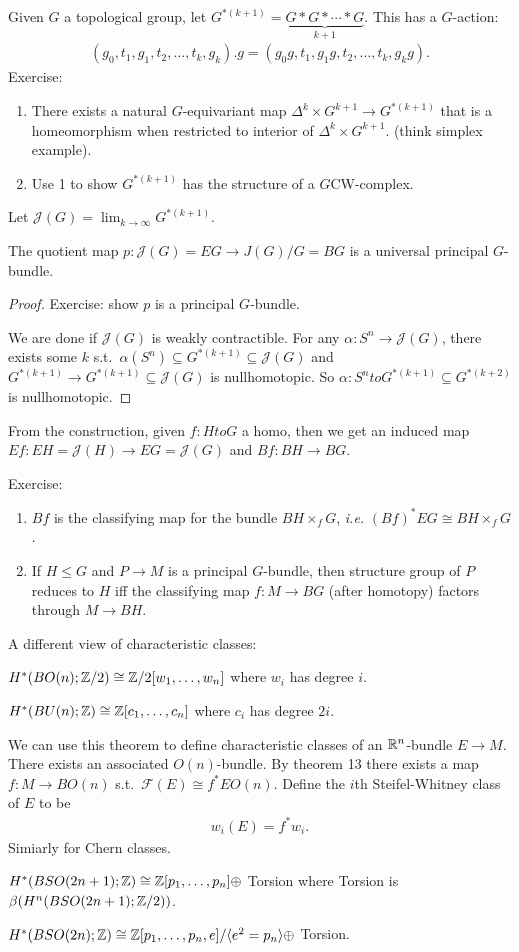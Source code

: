 \documentclass[12pt,class=article,crop=false]{standalone}
\begin{document}
Given $ G$ a topological group, let  $ G^{*(k+1)} = \underbrace{ G* G * \cdots * G}_{k+1 } $. This has a $ G$-action:
 \begin{align*}
	 (g_0,t_1,g_1,t_2,\ldots,t_k,g_k).g = (g_0 g, t_1, g_1g,t_2,\ldots,t_k,g_k g).
\end{align*}
Exercise:
\begin{enumerate}[label=(\arabic*)]
	\item There exists a natural $ G$-equivariant map $ \Delta^{k} \times G ^{k+1} \to G^{*(k+1)}$ that is a homeomorphism when restricted to interior of $ \Delta ^{k} \times G^{k+1}$. (think simplex example).
	\item Use 1 to show $ G^{*(k+1)}$ has the structure of a $ G$CW-complex.
\end{enumerate}
Let $ \mathcal{ J}(G) = \lim_{ k \to \infty} G^{*(k+1)}$.
\begin{thm}
The quotient map $ p: \mathcal{ J}(G)=EG \to J(G) / G = BG$ is a universal principal $ G$-bundle.
\end{thm}
\begin{proof}
Exercise: show $ p$ is a principal  $ G$-bundle.

We are done if  $ \mathcal{ J}(G)$ is weakly contractible. For any $ \alpha: S^{n} \to \mathcal{ J}(G)$, there exists some $ k$ s.t.\ $ \alpha(S^{n}) \subseteq G^{*(k+1)} \subseteq \mathcal{ J}(G)$ and $ G^{*(k+1)} \to G^{*(k+1)} \subseteq \mathcal{ J}(G)$ is nullhomotopic. So $ \alpha: S^{n} to G^{*(k+1)} \subseteq G^{*(k+2)}$ is nullhomotopic.
\end{proof}

From the construction, given $ f:H to G$ a homo, then we get an induced map  $ Ef: EH = \mathcal{ J}(H) \to EG= \mathcal{ J}(G)$ and $ Bf: BH \to BG$.

Exercise:
\begin{enumerate}[label=(\arabic*)]
	\item $ Bf$ is the classifying map for the bundle  $ BH \times _f G$, \emph{i.e.} $ (Bf)^* EG \cong BH \times _f G$.
	\item If $ H \leq G$ and  $ P \to M$ is a principal $ G$-bundle, then structure group of  $ P$ reduces to  $ H$ iff the classifying map  $ f: M \to BG$ (after homotopy) factors through $ M \to BH$.
\end{enumerate}

A different view of characteristic classes:
\begin{thm}
	$ H^* (BO(n); \mathbb{Z} /2) \cong \mathbb{Z} /2[w_1,\ldots,w_n]$ where $ w_i$ has degree $ i$.

	$ H^* (BU(n); \mathbb{Z}) \cong \mathbb{Z} [c_1,\ldots,c_n]$ where $ c_i$ has degree $ 2i$.
\end{thm}
We can use this theorem to define characteristic classes of an $ \mathbb{R}^{n}$-bundle $ E \to M$. There exists an associated $ O(n)$-bundle. By theorem 13 there exists a map  $ f: M \to BO(n)$ s.t.\ $ \mathcal{ F}(E) \cong f^* EO(n)$. Define the $ i$th Steifel-Whitney class of  $ E$ to be
 \begin{align*}
	w_i(E) = f^* w_i.
\end{align*}
Simiarly for Chern classes.


\begin{thm}
	$ H^* (BSO(2n+1); \mathbb{Z}) \cong \mathbb{Z} [p_1,\ldots,p_n] \oplus $ Torsion where Torsion is $ \beta(H^{n}(BSO(2n+1); \mathbb{Z} /2))$.

	$ H^* (BSO(2n);\mathbb{Z}) \cong \mathbb{Z}[p_1,\ldots,p_n, e] / \langle e ^2 =p_n  \rangle \oplus $ Torsion.
\end{thm}
\end{document}
